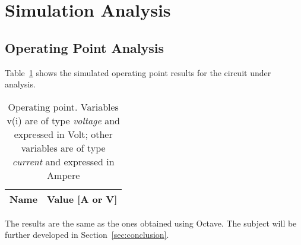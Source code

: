 \section{Simulation Analysis}
\label{sec:simulation}

\subsection{Operating Point Analysis}

Table~\ref{tab:op} shows the simulated operating point results for the circuit
under analysis. 

\begin{table}[H]
  \centering
  \begin{tabular}{|l|r|}
    \hline    
    {\bf Name} & {\bf Value [A or V]} \\ \hline
    
  \end{tabular}
  \caption{Operating point. Variables v(i) are of type {\it voltage} and expressed in
    Volt; other variables are of type {\it current} and expressed in Ampere}
  \label{tab:op}
\end{table}

The results are the same as the ones obtained using Octave. The subject will be further developed in Section~\ref{sec:conclusion}.




